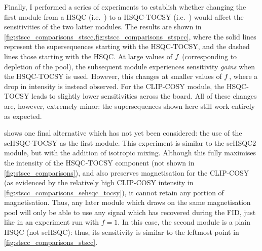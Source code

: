 Finally, I performed a series of experiments to establish whether changing the first module from a HSQC (i.e.\ ) to a HSQC-TOCSY (i.e.\ ) would affect the sensitivities of the two latter modules.
The results are shown in \cref{fig:stscc_comparisons_stscc,fig:stscc_comparisons_stspcc}, where the solid lines represent the supersequences starting with the HSQC-TOCSY, and the dashed lines those starting with the HSQC.
At large values of $f\/$ (corresponding to depletion of the  pool), the subsequent \carbon{} module experiences sensitivity \textit{gains} when the HSQC-TOCSY is used.
However, this changes at smaller values of $f\/$, where a drop in intensity is instead observed.
For the CLIP-COSY module, the HSQC-TOCSY leads to slightly lower sensitivities across the board.
All of these changes are, however, extremely minor: the supersequences shown here still work entirely as expected.

 shows one final alternative which has not yet been considered: the use of the seHSQC-TOCSY\autocite{Hansen2021AC} as the first module.
This experiment is similar to the seHSQC2 module, but with the addition of isotropic mixing.
Although this fully maximises the intensity of the HSQC-TOCSY component (not shown in \cref{fig:stscc_comparisons}), and also preserves  magnetisation for the CLIP-COSY (as evidenced by the relatively high CLIP-COSY intensity in \cref{fig:stscc_comparisons_sehsqc_tocsy}), it cannot retain any portion of  magnetisation.
Thus, any later module which draws on the same magnetisation pool will only be able to use any signal which has recovered during the FID, just like in an experiment run with $f = 1$.
In this case, the second module is a plain HSQC (not seHSQC): thus, its sensitivity is similar to the leftmost point in \cref{fig:stscc_comparisons_stscc}.

